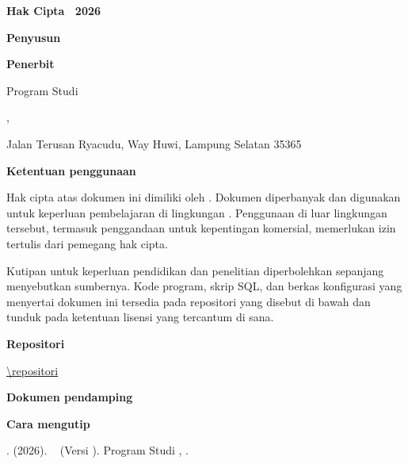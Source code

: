 \noindent
\begin{minipage}{\linewidth}
\small

\textbf{Hak Cipta \textcopyright\ 2026}\par
\pemeganghakcipta\par

\vspace{1.0em}

\textbf{Penyusun}\par
\penyusun\par

\vspace{1.0em}

\textbf{Penerbit}\par
Program Studi \programname\par
\facultyname, \universityname\par
Jalan Terusan Ryacudu, Way Huwi, Lampung Selatan 35365\par

\vspace{1.0em}

\textbf{Ketentuan penggunaan}\par
Hak cipta atas dokumen ini dimiliki oleh \pemeganghakcipta.
Dokumen diperbanyak dan digunakan untuk keperluan pembelajaran di lingkungan
\universityname. Penggunaan di luar lingkungan tersebut, termasuk penggandaan
untuk kepentingan komersial, memerlukan izin tertulis dari pemegang hak cipta.

\vspace{0.8em}

Kutipan untuk keperluan pendidikan dan penelitian diperbolehkan sepanjang
menyebutkan sumbernya. Kode program, skrip SQL, dan berkas konfigurasi yang
menyertai dokumen ini tersedia pada repositori yang disebut di bawah dan tunduk
pada ketentuan lisensi yang tercantum di sana.

\vspace{1.0em}

\textbf{Repositori}\par
\url{\repositori}

\vspace{1.0em}

\textbf{Dokumen pendamping}\par
\bukupendamping

\vspace{1.0em}

\textbf{Cara mengutip}\par
\penyusun. (2026). \emph{\jenisdokumen\ \coursename} (Versi \docversion).
Program Studi \programname, \universityname.

\vspace{1.2em}


\end{minipage}

\vfill
\noindent\brandrule
\clearpage
